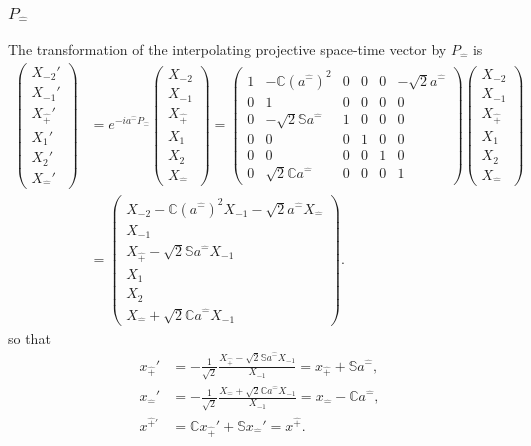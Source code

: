 \documentclass[foundations,article,submit,pdftex,moreauthors]{Definitions/mdpi}
\begin{document}
\subsubsection{\texorpdfstring{$P_{\hat{-}}$}{P hat minus}}

The transformation of the interpolating projective space-time vector by
$P_{\hat{-}}$ is
\begin{align}
\begin{pmatrix}
X_{-2}'\\ X_{-1}'\\ X_{\hat{+}}'\\ X_1'\\ X_2'\\ X_{\hat{-}}'
\end{pmatrix}
&=e^{-ia^{\hat{-}}P_{\hat{-}}}
\begin{pmatrix}
X_{-2}\\ X_{-1}\\ X_{\hat{+}}\\ X_1\\ X_2\\ X_{\hat{-}}
\end{pmatrix}
=\begin{pmatrix}
1 & - \mathbb{C} (a^{\hat{-}})^{2} & 0 & 0 & 0 & - \sqrt{2} a^{\hat{-}}\\
0 & 1 & 0 & 0 & 0 & 0\\
0 & - \sqrt{2} \mathbb{S} a^{\hat{-}} & 1 & 0 & 0 & 0\\
0 & 0 & 0 & 1 & 0 & 0\\
0 & 0 & 0 & 0 & 1 & 0\\
0 & \sqrt{2} \mathbb{C} a^{\hat{-}} & 0 & 0 & 0 & 1
\end{pmatrix}
\begin{pmatrix}
X_{-2}\\ X_{-1}\\ X_{\hat{+}}\\ X_1\\ X_2\\ X_{\hat{-}}
\end{pmatrix}\\
&=\begin{pmatrix}
X_{-2}-\mathbb{C}(a^{\hat{-}})^2X_{-1}
-\sqrt{2}a^{\hat{-}}X_{\hat{-}}\\
X_{-1}\\
X_{\hat{+}}-\sqrt{2}\mathbb{S}a^{\hat{-}}X_{-1}\\
X_1\\ X_2\\
X_{\hat{-}}+\sqrt{2}\mathbb{C}a^{\hat{-}}X_{-1}
\end{pmatrix}.
\end{align}
so that
\begin{align}
x_{\hat{+}}'
&=-\frac{1}{\sqrt{2}}\frac{X_{\hat{+}}-\sqrt{2}\mathbb{S}a^{\hat{-}}X_{-1}}{X_{-1}}
=x_{\hat{+}}+\mathbb{S}a^{\hat{-}}, \nonumber\\
x_{\hat{-}}'
&=-\frac{1}{\sqrt{2}}\frac{X_{\hat{-}}+\sqrt{2}\mathbb{C}a^{\hat{-}}X_{-1}}{X_{-1}}
=x_{\hat{-}}-\mathbb{C}a^{\hat{-}}, \nonumber\\
x^{\hat{+}\prime}
&=\mathbb{C}x_{\hat{+}}'+\mathbb{S}x_{\hat{-}}'
=x^{\hat{+}}.
\end{align}
\end{document}
